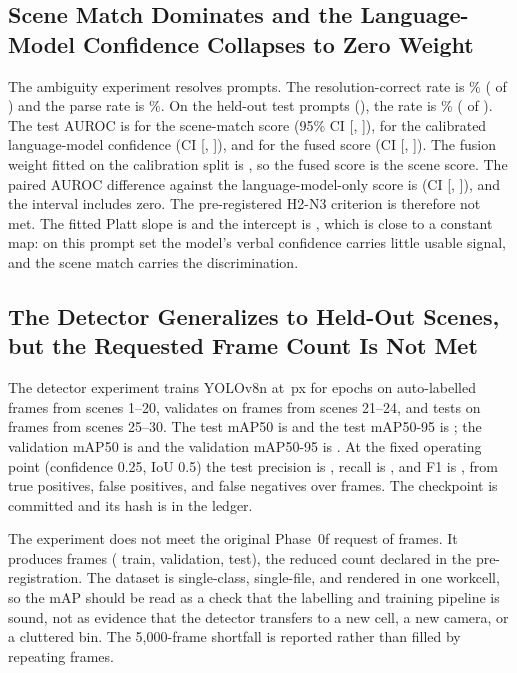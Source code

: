\documentclass[journal]{IEEEtran}
\begin{document}
\subsection{Scene Match Dominates and the Language-Model Confidence Collapses to Zero Weight}
The ambiguity experiment resolves \nThreeN{} prompts. The resolution-correct rate is \nThreeSuccessPct\% (\nThreeSuccessN{} of \nThreeN) and the parse rate is \nThreeParsePct\%. On the held-out test prompts (\nThreeTestN), the rate is \nThreeTestSuccessPct\% (\nThreeTestSuccessN{} of \nThreeTestN). The test AUROC is \nThreeSceneAuroc{} for the scene-match score (95\% CI [\nThreeSceneLo, \nThreeSceneHi]), \nThreeLlmAuroc{} for the calibrated language-model confidence (CI [\nThreeLlmLo, \nThreeLlmHi]), and \nThreeFusedAuroc{} for the fused score (CI [\nThreeFusedLo, \nThreeFusedHi]). The fusion weight fitted on the calibration split is \nThreeFusionWeight, so the fused score is the scene score. The paired AUROC difference against the language-model-only score is \nThreeFusedMinusLlmAuroc{} (CI [\nThreeFusedMinusLlmLo, \nThreeFusedMinusLlmHi]), and the interval includes zero. The pre-registered H2-N3 criterion is therefore not met. The fitted Platt slope is \nThreePlattA{} and the intercept is \nThreePlattB, which is close to a constant map: on this prompt set the model's verbal confidence carries little usable signal, and the scene match carries the discrimination.

\subsection{The Detector Generalizes to Held-Out Scenes, but the Requested Frame Count Is Not Met}
The detector experiment trains YOLOv8n at \detImgsz\,px for \detEpochs{} epochs on \detTrainN{} auto-labelled frames from scenes 1--20, validates on \detValN{} frames from scenes 21--24, and tests on \detTestN{} frames from scenes 25--30. The test mAP50 is \detMapFiftyTest{} and the test mAP50-95 is \detMapFiftyToNinetyFiveTest; the validation mAP50 is \detMapFiftyVal{} and the validation mAP50-95 is \detMapFiftyToNinetyFiveVal. At the fixed operating point (confidence 0.25, IoU 0.5) the test precision is \detOpPrecision{}, recall is \detOpRecall{}, and F1 is \detOpFOne, from \detOpTP{} true positives, \detOpFP{} false positives, and \detOpFN{} false negatives over \detTestN{} frames. The checkpoint is committed and its hash is in the ledger.

The experiment does not meet the original Phase~0f request of \detRequestedN{} frames. It produces \detTotalN{} frames (\detTrainN{} train, \detValN{} validation, \detTestN{} test), the reduced count declared in the pre-registration. The dataset is single-class, single-file, and rendered in one workcell, so the mAP should be read as a check that the labelling and training pipeline is sound, not as evidence that the detector transfers to a new cell, a new camera, or a cluttered bin. The 5,000-frame shortfall is reported rather than filled by repeating frames.
\end{document}

